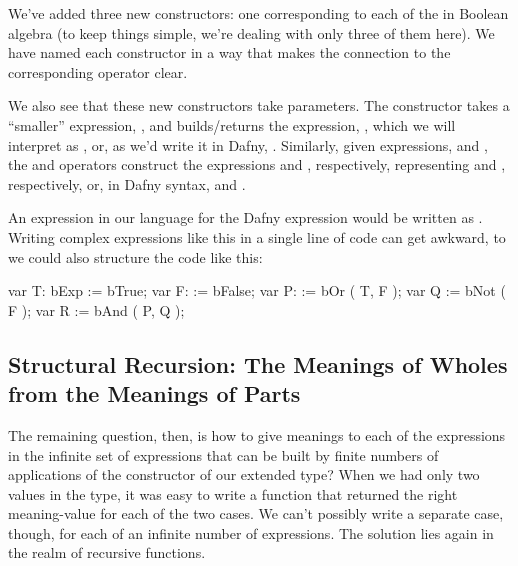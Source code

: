 \documentclass[letterpaper,10pt,english]{sphinxmanual}
\begin{document}
We’ve added three new constructors: one corresponding to each of the
 in Boolean algebra (to keep things simple, we’re dealing
with only three of them here). We have named each constructor in a way
that makes the connection to the corresponding operator clear.

We also see that these new constructors take parameters. The 
constructor takes a “smaller” expression, , and builds/returns the
expression, , which we will interpret as , or, as we’d
write it in Dafny, . Similarly, given expressions,  and ,
the  and  operators construct the expressions 
and , respectively, representing  and , respectively, or, in Dafny syntax,  and .

An expression in our  language for the Dafny expression  would be written as . Writing complex expressions like this in
a single line of code can get awkward, to we could also structure the
code like this:

\begin{sphinxVerbatim}[commandchars=\\\{\}]
var T: bExp := bTrue;
var F:      := bFalse;
var P:      := bOr ( T,  F );
var Q       := bNot ( F );
var R       := bAnd ( P, Q );
\end{sphinxVerbatim}


\subsection{Structural Recursion: The Meanings of Wholes from the Meanings of Parts}
\label{\detokenize{10-formal-languages:structural-recursion-the-meanings-of-wholes-from-the-meanings-of-parts}}
The remaining question, then, is how to give meanings to each of the
expressions in the infinite set of expressions that can be built by
finite numbers of applications of the constructor of our extended
 type? When we had only two values in the type, it was easy to
write a function that returned the right meaning-value for each of the
two cases. We can’t possibly write a separate case, though, for each
of an infinite number of expressions. The solution lies again in the
realm of recursive functions.
\end{document}
